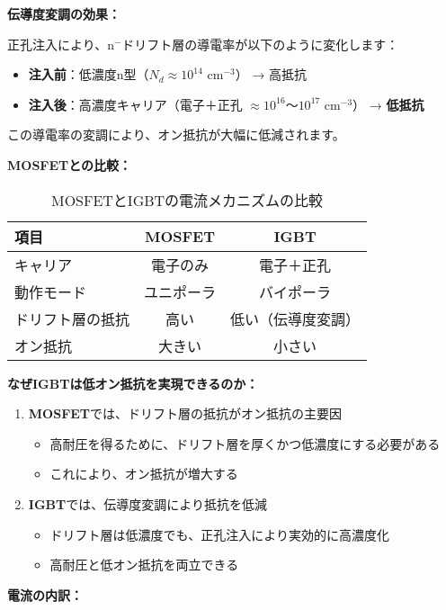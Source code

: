 \textbf{伝導度変調の効果：}

正孔注入により、n$^-$ドリフト層の導電率が以下のように変化します：

\begin{itemize}
\item \textbf{注入前}：低濃度n型（$N_d \approx 10^{14}$ cm$^{-3}$） → 高抵抗
\item \textbf{注入後}：高濃度キャリア（電子＋正孔 $\approx 10^{16}$〜$10^{17}$ cm$^{-3}$） → \textbf{低抵抗}
\end{itemize}

この導電率の変調により、オン抵抗が大幅に低減されます。

\textbf{MOSFETとの比較：}

\begin{table}[H]
\centering
\caption{MOSFETとIGBTの電流メカニズムの比較}
\begin{tabular}{|l|c|c|}
\hline
\textbf{項目} & \textbf{MOSFET} & \textbf{IGBT} \\
\hline
キャリア & 電子のみ & 電子＋正孔 \\
\hline
動作モード & ユニポーラ & バイポーラ \\
\hline
ドリフト層の抵抗 & 高い & 低い（伝導度変調） \\
\hline
オン抵抗 & 大きい & 小さい \\
\hline
\end{tabular}
\end{table}

\textbf{なぜIGBTは低オン抵抗を実現できるのか：}

\begin{enumerate}
\item \textbf{MOSFET}では、ドリフト層の抵抗がオン抵抗の主要因
\begin{itemize}
\item 高耐圧を得るために、ドリフト層を厚くかつ低濃度にする必要がある
\item これにより、オン抵抗が増大する
\end{itemize}

\item \textbf{IGBT}では、伝導度変調により抵抗を低減
\begin{itemize}
\item ドリフト層は低濃度でも、正孔注入により実効的に高濃度化
\item 高耐圧と低オン抵抗を両立できる
\end{itemize}
\end{enumerate}

\textbf{電流の内訳：}

